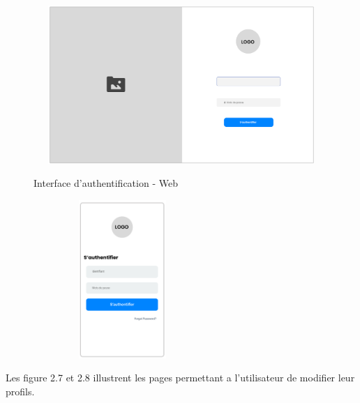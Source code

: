 \begin{figure}[h!]
  \centering
  \begin{minipage}[t]{0.60\textwidth}
    \centering
    \includegraphics[width=1\textwidth, height=6cm]{chap2.images/prot authentification.png}
    \caption{Interface d'authentification - Web}
  \end{minipage}
  \hfill
  \begin{minipage}[t]{0.38\textwidth}
    \centering
    \includegraphics[width=0.6\textwidth, height=6cm]{chap2.images/prot authentification mob.png}
    \caption{}
  \end{minipage}
\end{figure}

\vspace{1.2cm}

Les figure 2.7 et 2.8 illustrent les  pages permettant a l'utilisateur de modifier leur profils.

